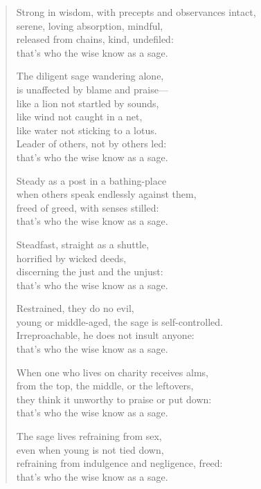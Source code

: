 \documentclass[12pt,openany]{book}%
\begin{document}
\begin{verse}
Strong in wisdom, with precepts and observances intact, \\
serene, loving absorption, mindful, \\
released from chains, kind, undefiled: \\
that’s who the wise know as a sage. 

The diligent sage wandering alone, \\
is unaffected by blame and praise—\\
like a lion not startled by sounds, \\
like wind not caught in a net, \\
like water not sticking to a lotus. \\
Leader of others, not by others led: \\
that’s who the wise know as a sage. 

Steady as a post in a bathing-place \\
when others speak endlessly against them, \\
freed of greed, with senses stilled: \\
that’s who the wise know as a sage. 

Steadfast, straight as a shuttle, \\
horrified by wicked deeds, \\
discerning the just and the unjust: \\
that’s who the wise know as a sage. 

Restrained, they do no evil, \\
young or middle-aged, the sage is self-controlled. \\
Irreproachable, he does not insult anyone: \\
that’s who the wise know as a sage. 

When one who lives on charity receives alms, \\
from the top, the middle, or the leftovers, \\
they think it unworthy to praise or put down: \\
that’s who the wise know as a sage. 

The sage lives refraining from sex, \\
even when young is not tied down, \\
refraining from indulgence and negligence, freed: \\
that’s who the wise know as a sage. 


\end{verse}
\end{document}
